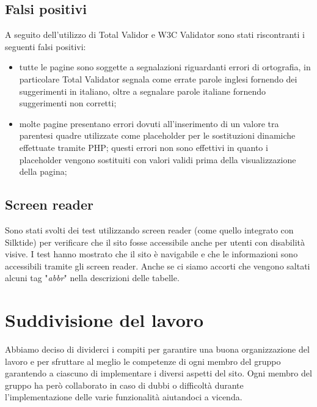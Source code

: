 \documentclass[11pt,a4paper]{article}
\begin{document}
\subsection{Falsi positivi}
A seguito dell'utilizzo di Total Validor e W3C Validator sono stati riscontranti i seguenti falsi positivi:
\begin{itemize}
    \item tutte le pagine sono soggette a segnalazioni riguardanti errori di ortografia, in particolare Total Validator segnala come errate parole inglesi fornendo dei suggerimenti in italiano, oltre a segnalare parole italiane fornendo suggerimenti non corretti; 
    \item molte pagine presentano errori dovuti all'inserimento di un valore tra parentesi quadre utilizzate come placeholder per le sostituzioni dinamiche effettuate tramite PHP; questi errori non sono effettivi in quanto i placeholder vengono sostituiti con valori validi prima della visualizzazione della pagina;
\end{itemize}
\subsection{Screen reader}
Sono stati svolti dei test utilizzando screen reader (come quello integrato con Silktide) per verificare che il sito fosse accessibile anche per utenti con disabilità visive. I test hanno mostrato che il sito è navigabile e che le informazioni sono accessibili tramite gli screen reader. Anche se ci siamo accorti che vengono saltati alcuni tag "\textit{abbr}" nella descrizioni delle tabelle.

\section{Suddivisione del lavoro}
Abbiamo deciso di dividerci i compiti per garantire una buona organizzazione del lavoro e per sfruttare al meglio le competenze di ogni membro del gruppo garantendo a ciascuno di implementare i diversi aspetti del sito.
Ogni membro del gruppo ha però collaborato in caso di dubbi o difficoltà durante l'implementazione delle varie funzionalità aiutandoci a vicenda.
\end{document}
